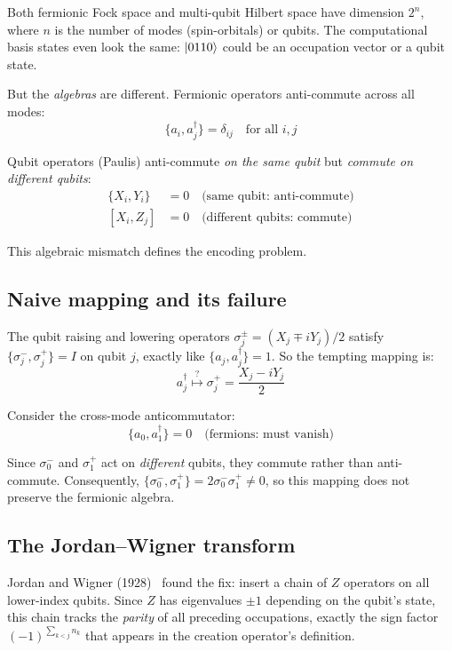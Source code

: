 \documentclass[aps,prb,preprint,longbibliography,nofootinbib]{revtex4-2}
\begin{document}
Both fermionic Fock space and multi-qubit Hilbert space have dimension
$2^n$, where $n$ is the number of modes (spin-orbitals) or qubits.  The
computational basis states even look the same: $\ket{0110}$ could be an
occupation vector or a qubit state.

But the \emph{algebras} are different.  Fermionic operators anti-commute
across all modes:
\begin{equation}
\{a_i, a^\dagger_j\} = \delta_{ij} \quad \text{for all } i, j
\end{equation}

Qubit operators (Paulis) anti-commute \emph{on the same qubit} but
\emph{commute on different qubits}:
\begin{align}
\{X_i, Y_i\} &= 0 \quad\text{(same qubit: anti-commute)} \\
[X_i, Z_j] &= 0 \quad\text{(different qubits: commute)}
\end{align}

This algebraic mismatch defines the encoding problem.

\subsection{Naive mapping and its failure}

The qubit raising and lowering operators
$\sigma^\pm_j = (X_j \mp iY_j)/2$ satisfy
$\{\sigma^-_j, \sigma^+_j\} = I$ on qubit $j$, exactly like
$\{a_j, a^\dagger_j\} = 1$.  So the tempting mapping is:
\begin{equation}
a^\dagger_j \stackrel{?}{\mapsto} \sigma^+_j
  = \frac{X_j - iY_j}{2}
\end{equation}

Consider the cross-mode anticommutator:
\begin{equation}
\{a_0, a^\dagger_1\} = 0 \quad\text{(fermions: must vanish)}
\end{equation}

Since $\sigma^-_0$ and $\sigma^+_1$ act on \emph{different} qubits,
they commute rather than anti-commute.  Consequently,
$\{\sigma^-_0,\sigma^+_1\}=2\sigma^-_0\sigma^+_1\neq 0$, so this
mapping does not preserve the fermionic algebra.

\subsection{The Jordan--Wigner transform}

Jordan and Wigner (1928)~\cite{jordan1928} found the fix: insert
a chain of $Z$ operators on all lower-index qubits.  Since $Z$ has
eigenvalues $\pm 1$ depending on the qubit's state, this chain tracks
the \emph{parity} of all preceding occupations, exactly the sign
factor $(-1)^{\sum_{k<j} n_k}$ that appears in the creation operator's
definition.
\end{document}
